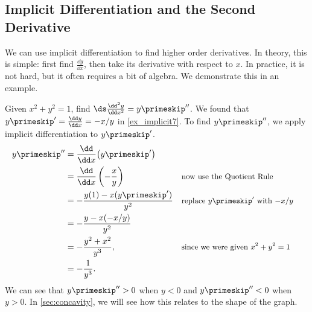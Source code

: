 %
%
%

\subsection{Implicit Differentiation and the Second Derivative}

We can use implicit differentiation to find higher order derivatives. In theory, this is simple: first find $\frac{\dd y}{\dd x}$, then take its derivative with respect to $x$. In practice, it is not hard, but it often requires a bit of algebra. We demonstrate this in an example.

\begin{example}\label{ex_implicit9}
Given $x^2+y^2=1$, find $\ds\frac{\dd^2y}{\dd x^2} = y\primeskip''$.
\solution
We found that $y\primeskip' = \frac{\dd y}{\dd x} = -x/y$ in \autoref{ex_implicit7}. To find $y\primeskip''$, we apply implicit differentiation to $y\primeskip'$.
{\allowdisplaybreaks
\begin{align*}
	y\primeskip''
	&= \frac{\dd}{\dd x}\bigl(y\primeskip'\bigr) \\
	&= \frac{\dd}{\dd x}\left(-\frac xy\right) && \text{\small now use the Quotient Rule} \\
	&= -\frac{y(1) - x(y\primeskip')}{y^2} && \text{\small replace $y\primeskip'$ with $-x/y$} \\
	&= -\frac{y-x(-x/y)}{y^2}\\
	&= -\frac{y^2+x^2}{y^3}, && \text{\small since we were given $x^2+y^2=1$} \\
	&= -\frac1{y^3}.
\end{align*}}
We can see that $y\primeskip''>0$ when $y<0$ and $y\primeskip''<0$ when $y>0$. In \autoref{sec:concavity}, we will see how this relates to the shape of the graph.
\end{example}


